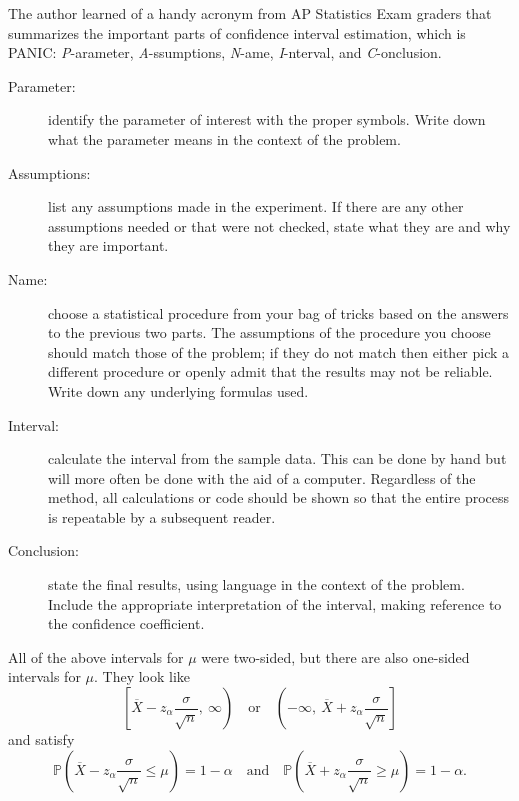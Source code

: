 \documentclass[captions=tableheading]{scrbook}
\begin{document}
The author learned of a handy acronym from AP Statistics Exam graders that summarizes the important parts of confidence interval estimation, which is PANIC: \emph{P}-arameter, \emph{A}-ssumptions, \emph{N}-ame, \emph{I}-nterval, and \emph{C}-onclusion.
\begin{description}
\item[Parameter:] identify the parameter of interest with the proper symbols. Write down what the parameter means in the context of the problem.
\item[Assumptions:] list any assumptions made in the experiment. If there are any other assumptions needed or that were not checked, state what they are and why they are important.
\item[Name:] choose a statistical procedure from your bag of tricks based on the answers to the previous two parts. The assumptions of the procedure you choose should match those of the problem; if they do not match then either pick a different procedure or openly admit that the results may not be reliable. Write down any underlying formulas used.
\item[Interval:] calculate the interval from the sample data. This can be done by hand but will more often be done with the aid of a computer. Regardless of the method, all calculations or code should be shown so that the entire process is repeatable by a subsequent reader.
\item[Conclusion:] state the final results, using language in the context of the problem. Include the appropriate interpretation of the interval, making reference to the confidence coefficient.
\end{description}

\begin{rem}
All of the above intervals for \(\mu\) were two-sided, but there are also one-sided intervals for \(\mu\). They look like
\begin{equation}
\left[\overline{X}-z_{\alpha}\frac{\sigma}{\sqrt{n}},\ \infty\right)\quad \mbox{or}\quad \left(-\infty,\ \overline{X}+z_{\alpha}\frac{\sigma}{\sqrt{n}}\right]
\end{equation}
and satisfy
\begin{equation}
\mathbb{P}\left(\overline{X}-z_{\alpha}\frac{\sigma}{\sqrt{n}}\leq\mu\right)=1-\alpha\quad \mbox{and}\quad \mathbb{P}\left(\overline{X}+z_{\alpha}\frac{\sigma}{\sqrt{n}}\geq\mu\right)=1-\alpha.
\end{equation}
\end{rem}
\end{document}
